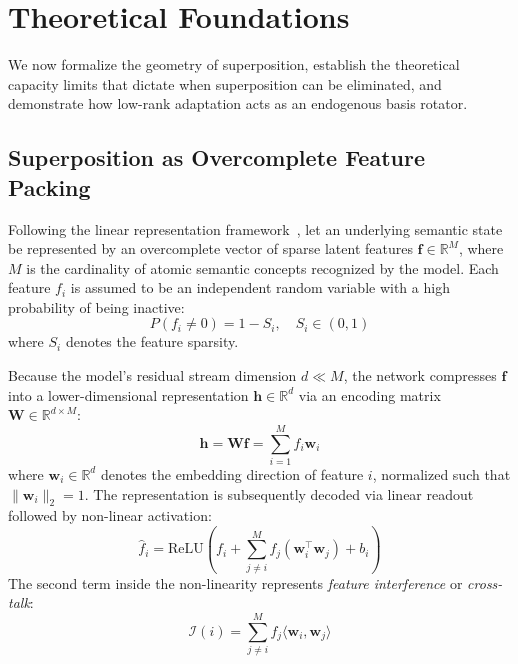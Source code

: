 \documentclass[10pt,twocolumn,letterpaper]{article}
\begin{document}
\section{Theoretical Foundations}
\label{sec:foundations}

We now formalize the geometry of superposition, establish the theoretical capacity limits that dictate when superposition can be eliminated, and demonstrate how low-rank adaptation acts as an endogenous basis rotator.

\subsection{Superposition as Overcomplete Feature Packing}
\label{subsec:superposition_theory}

Following the linear representation framework~\cite{elhage2022toy}, let an underlying semantic state be represented by an overcomplete vector of sparse latent features $\bm{f} \in \mathbb{R}^M$, where $M$ is the cardinality of atomic semantic concepts recognized by the model. Each feature $f_i$ is assumed to be an independent random variable with a high probability of being inactive:
\begin{equation}
    P(f_i \neq 0) = 1 - S_i, \quad S_i \in (0, 1)
\end{equation}
where $S_i$ denotes the feature sparsity.

Because the model's residual stream dimension $d \ll M$, the network compresses $\bm{f}$ into a lower-dimensional representation $\bm{h} \in \mathbb{R}^d$ via an encoding matrix $\bm{W} \in \mathbb{R}^{d \times M}$:
\begin{equation}
    \bm{h} = \bm{W} \bm{f} = \sum_{i=1}^M f_i \bm{w}_i
\end{equation}
where $\bm{w}_i \in \mathbb{R}^d$ denotes the embedding direction of feature $i$, normalized such that $\|\bm{w}_i\|_2 = 1$. The representation is subsequently decoded via linear readout followed by non-linear activation:
\begin{equation}
    \hat{f}_i = \text{ReLU}\left( f_i + \sum_{j \neq i}^M f_j (\bm{w}_i^\top \bm{w}_j) + b_i \right)
\end{equation}
The second term inside the non-linearity represents \textit{feature interference} or \textit{cross-talk}:
\begin{equation}
    \mathcal{I}(i) = \sum_{j \neq i}^M f_j \langle \bm{w}_i, \bm{w}_j \rangle
\end{equation}
\end{document}
